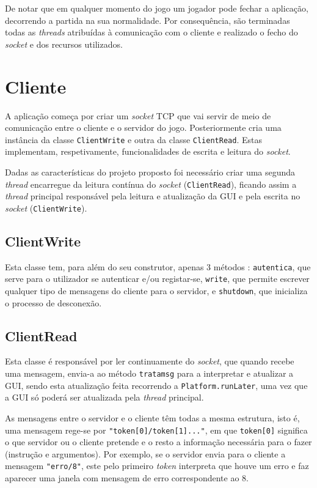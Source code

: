 \documentclass{llncs}
\begin{document}
De notar que em qualquer momento do jogo um jogador pode fechar a aplicação, decorrendo a partida 
na sua normalidade. Por consequência, são terminadas todas as \textit{threads} 
atribuídas à comunicação com o cliente e realizado o fecho do \textit{socket} e dos 
recursos utilizados.

\section{Cliente}

A aplicação começa por criar um \textit{socket} TCP que vai servir de meio de comunicação entre o cliente e o servidor do jogo. Posteriormente cria uma instância da classe \texttt{ClientWrite} e outra da classe \texttt{ClientRead}. Estas implementam, respetivamente, funcionalidades de escrita e leitura do \textit{socket}.

Dadas as características do projeto proposto foi necessário criar uma segunda \textit{thread} encarregue da leitura contínua do \textit{socket} (\texttt{ClientRead}), ficando assim a \textit{thread} principal responsável pela leitura e atualização da GUI e pela escrita no \textit{socket} (\texttt{ClientWrite}). 

\subsection{ClientWrite}

Esta classe tem, para além do seu construtor, apenas 3 métodos : \texttt{autentica}, que serve para o utilizador se autenticar e/ou registar-se, \texttt{write}, que permite escrever qualquer tipo de mensagens do cliente para o servidor, e \texttt{shutdown}, que inicializa o processo de desconexão.

\subsection{ClientRead}

Esta classe é responsável por ler continuamente do \textit{socket}, que quando recebe uma mensagem, envia-a ao método \texttt{tratamsg} para a interpretar e atualizar a GUI, sendo esta atualização feita recorrendo a \texttt{Platform.runLater}, uma vez que a GUI só poderá ser atualizada pela \textit{thread} principal.

As mensagens entre o servidor e o cliente têm todas a mesma estrutura, isto é, uma mensagem rege-se por \texttt{"token[0]/token[1]..."}, em que \texttt{token[0]} significa o que servidor ou o cliente pretende e o resto a informação necessária para o fazer (instrução e argumentos). Por exemplo, se o servidor envia para o cliente a mensagem \texttt{"erro/8"}, este pelo primeiro \textit{token} interpreta que houve um erro e faz aparecer uma janela com mensagem de erro correspondente ao 8.
\end{document}
